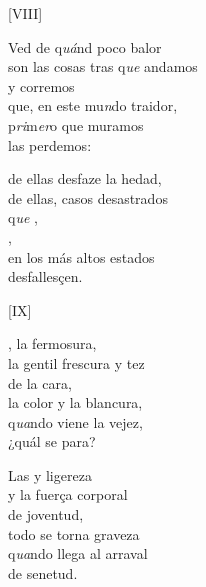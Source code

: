 \documentclass[11pt,a4paper,twoside]{article}
\begin{document}
\begin{center}
	[VIII]
\end{center}
\pstart
Ved de q\emph{uá}nd poco balor\\
son las cosas tras q\emph{ue} andamos\\
y corremos\\
que, en este mu\emph{n}do traidor,\\
 p\emph{ri}m\emph{er}o que muramos\\
las perdemos:\par
de ellas desfaze la hedad,\\
de ellas, casos desastrados\\
q\emph{ue} ,\\
,\\
en los más altos estados\\
desfallesçen.\par
\pend

\begin{center}
	[IX]
\end{center}
\pstart
{}, la fermosura,\\
la gentil frescura y tez\\
de la cara,\\
la color y la blancura,\\
q\emph{ua}ndo viene la vejez,\\
¿quál se para?\par
Las  y ligereza\\
y la fuerça corporal\\
de joventud,\\
todo se torna graveza\\
q\emph{ua}ndo llega al arraval \\
de senetud.\par
\pend
\end{document}
